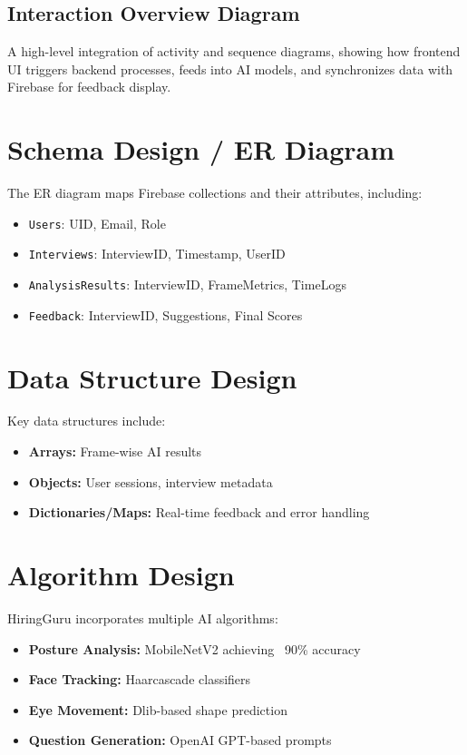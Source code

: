 \subsection{Interaction Overview Diagram}
A high-level integration of activity and sequence diagrams, showing how frontend UI triggers backend processes, feeds into AI models, and synchronizes data with Firebase for feedback display.

\section{Schema Design / ER Diagram}
The ER diagram maps Firebase collections and their attributes, including:
\begin{itemize}
  \item \texttt{Users}: UID, Email, Role
  \item \texttt{Interviews}: InterviewID, Timestamp, UserID
  \item \texttt{AnalysisResults}: InterviewID, FrameMetrics, TimeLogs
  \item \texttt{Feedback}: InterviewID, Suggestions, Final Scores
\end{itemize}

\section{Data Structure Design}
Key data structures include:
\begin{itemize}
  \item \textbf{Arrays:} Frame-wise AI results
  \item \textbf{Objects:} User sessions, interview metadata
  \item \textbf{Dictionaries/Maps:} Real-time feedback and error handling
\end{itemize}

\section{Algorithm Design}
HiringGuru incorporates multiple AI algorithms:
\begin{itemize}
  \item \textbf{Posture Analysis:} MobileNetV2 achieving ~90\% accuracy
  \item \textbf{Face Tracking:} Haarcascade classifiers
  \item \textbf{Eye Movement:} Dlib-based shape prediction
  \item \textbf{Question Generation:} OpenAI GPT-based prompts
\end{itemize}

